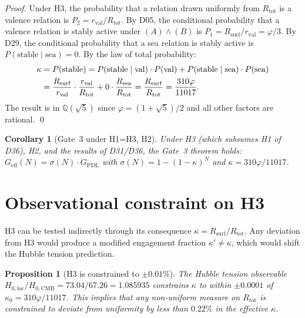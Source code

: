 \documentclass[11pt,a4paper]{article}
\newtheorem{proposition}[theorem]{Proposition}
\newtheorem{corollary}[theorem]{Corollary}
\theoremstyle{definition}
\newcommand{\rval}{r_{\mathrm{val}}}
\newcommand{\Rsea}{R_{\mathrm{sea}}}
\newcommand{\Rtot}{R_{\mathrm{tot}}}
\newcommand{\Rsurf}{R_{\mathrm{surf}}}
\newcommand{\vp}{\varphi}
\newcommand{\kap}{\kappa}
\newcommand{\sig}{\sigma}
\newcommand{\GPDL}{G_{\mathrm{PDL}}}
\newcommand{\Geff}{G_{\mathrm{eff}}}
\begin{document}
\begin{proof}
Under H3, the probability that a relation drawn uniformly from $\Rtot$
is a valence relation is $P_2 = \rval/\Rtot$.
By D05, the conditional probability that a valence relation is stably
active under $(A)\wedge(B)$ is $P_1 = \Rsurf/\rval = \vp/3$.
By D29, the conditional probability that a sea relation is stably
active is $P(\mathrm{stable}\mid\mathrm{sea}) = 0$.
By the law of total probability:
\begin{align}
\kap &= P(\mathrm{stable})
= P(\mathrm{stable}\mid\mathrm{val})\cdot P(\mathrm{val})
+ P(\mathrm{stable}\mid\mathrm{sea})\cdot P(\mathrm{sea}) \notag\\
&= \frac{\Rsurf}{\rval}\cdot\frac{\rval}{\Rtot}
+ 0\cdot\frac{\Rsea}{\Rtot}
= \frac{\Rsurf}{\Rtot}
= \frac{310\vp}{11017}.
\label{eq:kappa_proof}
\end{align}
The result is in $\mathbb{Q}(\sqrt{5})$ since $\vp = (1+\sqrt{5})/2$
and all other factors are rational. \qed
\end{proof}

\begin{corollary}[Gate~3 under H1=H3, H2]
\label{cor:gate3}
Under H3 (which subsumes H1 of D36), H2, and the results of D31/D36,
the Gate~3 theorem holds:
$\Geff(N) = \sig(N)\cdot\GPDL$ with $\sig(N) = 1-(1-\kap)^N$
and $\kap = 310\vp/11017$.
\end{corollary}

\section{Observational constraint on H3}
\label{sec:constraint}

H3 can be tested indirectly through its consequence $\kap = \Rsurf/\Rtot$.
Any deviation from H3 would produce a modified engagement fraction
$\kap' \neq \kap$, which would shift the Hubble tension prediction.

\begin{proposition}[H3 is constrained to $\pm 0.01\%$]
\label{prop:constraint}
The Hubble tension observable $H_{0,\mathrm{loc}}/H_{0,\mathrm{CMB}}
= 73.04/67.26 = 1.085935$ constrains $\kap$ to within $\pm 0.0001$
of $\kap_0 = 310\vp/11017$. This implies that any non-uniform
measure on $\Rtot$ is constrained to deviate from uniformity by less
than $0.22\%$ in the effective $\kap$.
\end{proposition}
\end{document}
